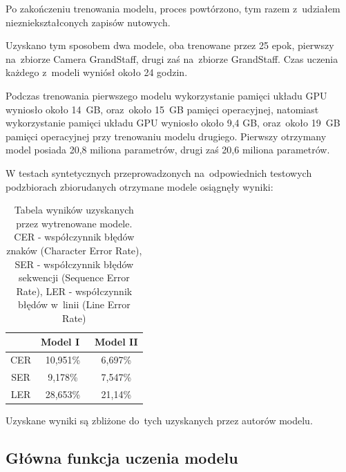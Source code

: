 Po zakończeniu trenowania modelu, proces powtórzono, tym razem z~udziałem niezniekształconych zapisów nutowych.

Uzyskano tym sposobem dwa modele, oba trenowane przez 25 epok, pierwszy na~zbiorze Camera GrandStaff, drugi zaś na~zbiorze GrandStaff. Czas uczenia każdego z~modeli wyniósł około 24 godzin.

Podczas trenowania pierwszego modelu wykorzystanie pamięci układu GPU wyniosło około 14~GB, oraz~około 15~GB pamięci operacyjnej, natomiast wykorzystanie pamięci układu GPU wyniosło około 9,4  GB, oraz~około 19~GB pamięci operacyjnej przy trenowaniu modelu drugiego. Pierwszy otrzymany model posiada 20,8 miliona parametrów, drugi zaś 20,6 miliona parametrów.

W testach syntetycznych przeprowadzonych na~odpowiednich testowych podzbiorach zbioru\linebreak danych otrzymane modele osiągnęły wyniki:

\begin{table}[htb]
	\centering
	\begin{tabular}{|c|c|c|}
		\hline
		\ & Model I~& Model II \\
		\hline
		CER & 10,951\% & 6,697\% \\
		SER &  9,178\% & 7,547\% \\
		LER & 28,653\% & 21,14\% \\
		\hline
	\end{tabular}
	\caption{Tabela wyników uzyskanych przez wytrenowane modele. CER - współczynnik błędów znaków (Character Error Rate), SER - współczynnik błędów sekwencji (Sequence Error Rate), LER - współczynnik błędów w~linii (Line Error Rate)}
	\label{models-scores}
\end{table}

Uzyskane wyniki są zbliżone do~tych uzyskanych przez autorów modelu\cite{Rios-Vila2023}.

\subsection{Główna funkcja uczenia modelu}

